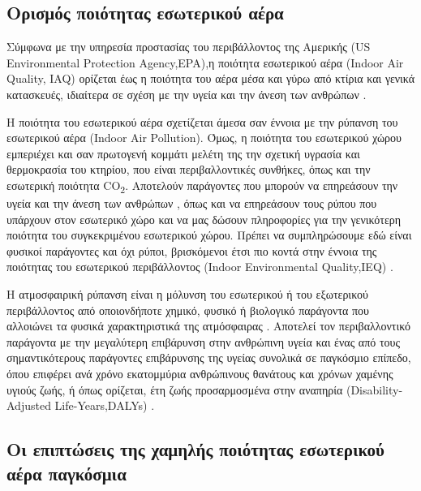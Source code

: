 \subsection{Ορισμός ποιότητας εσωτερικού αέρα}


Σύμφωνα με την υπηρεσία προστασίας του περιβάλλοντος της Αμερικής 
(US \linebreak Environmental Protection Agency,EPA),η ποιότητα εσωτερικού αέρα (Indoor Air Quality, IAQ) ορίζεται έως η ποιότητα του αέρα 
μέσα και γύρω από κτίρια και γενικά κατασκευές, ιδιαίτερα σε σχέση με την υγεία και την άνεση των ανθρώπων \cite{USEPA}.

Η ποιότητα του εσωτερικού αέρα σχετίζεται άμεσα σαν έννοια με την ρύπανση του εσωτερικού αέρα (Indoor Air Pollution).
Όμως, η ποιότητα του εσωτερικού χώρου εμπεριέχει και σαν πρωτογενή κομμάτι μελέτη της την σχετική υγρασία και θερμοκρασία του κτηρίου, που είναι περιβαλλοντικές συνθήκες, όπως και την εσωτερική ποιότητα CO\textsubscript{2}.
Αποτελούν παράγοντες που μπορούν να επηρεάσουν την υγεία και την άνεση των ανθρώπων \cite{10.1371/journal.pone.0305956}, όπως και να επηρεάσουν τους ρύπου που υπάρχουν στον εσωτερικό χώρο 
και να μας δώσουν πληροφορίες για την γενικότερη ποιότητα του συγκεκριμένου εσωτερικού χώρου.
Πρέπει να συμπληρώσουμε εδώ είναι φυσικοί παράγοντες και όχι ρύποι, βρισκόμενοι έτσι πιο κοντά στην έννοια της ποιότητας του εσωτερικού περιβάλλοντος (Indoor Environmental Quality,IEQ) \cite{Piasecki2017264}. 



Η ατμοσφαιρική ρύπανση είναι η μόλυνση του εσωτερικού ή του εξωτερικού περιβάλλοντος από οποιονδήποτε χημικό, 
φυσικό ή βιολογικό παράγοντα που αλλοιώνει τα φυσικά χαρακτηριστικά της ατμόσφαιρας \cite{WHODEFINITION}. 
Αποτελεί τον περιβαλλοντικό παράγοντα με την μεγαλύτερη επιβάρυνση στην ανθρώπινη υγεία \cite{WHO2021} και ένας από τους σημαντικότερους παράγοντες επιβάρυνσης της υγείας συνολικά σε παγκόσμιο επίπεδο, 
όπου επιφέρει ανά χρόνο εκατομμύρια ανθρώπινους θανάτους και χρόνων χαμένης υγιούς ζωής, ή όπως ορίζεται, έτη ζωής προσαρμοσμένα στην αναπηρία (Disability-Adjusted Life-Years,DALYs) \cite{Forouzanfar2015}.

 

\subsection{Οι επιπτώσεις της χαμηλής ποιότητας εσωτερικού αέρα παγκόσμια}


